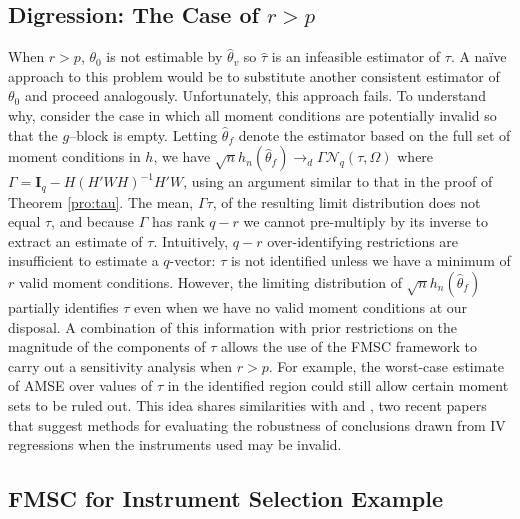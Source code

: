 \documentclass[12pt]{article}
\theoremstyle{definition}
\begin{document}

\subsection{Digression: The Case of $r > p$}
\label{subsec:digress}
When $r > p$,  $\theta_0$ is not estimable by $\widehat{\theta}_v$ so $\widehat{\tau}$ is an infeasible estimator of $\tau$. A na\"{i}ve approach to this problem would be to substitute another consistent estimator of $\theta_0$ and proceed analogously. Unfortunately, this approach fails. To understand why, consider the case in which all moment conditions are potentially invalid so that the $g$--block is empty. Letting $\widehat{\theta}_f$ denote the estimator based on the full set of moment conditions in $h$, we have $\sqrt{n}h_n(\widehat{\theta}_f) \rightarrow_d\Gamma  \mathcal{N}_q(\tau, \Omega)$ where $\Gamma = \mathbf{I}_q - H \left(H'WH\right)^{-1}H'W$, using an argument similar to that in the proof of Theorem \ref{pro:tau}. The mean, $\Gamma \tau$, of the resulting limit distribution does not equal $\tau$, and because $\Gamma$ has rank $q-r$ we cannot pre-multiply by its inverse to extract an estimate of $\tau$. Intuitively, $q-r$ over-identifying restrictions are insufficient to estimate a $q$-vector: $\tau$ is not identified unless we have a minimum of $r$ valid moment conditions. However, the limiting distribution of $\sqrt{n}h_n(\widehat{\theta}_f)$ partially identifies $\tau$ even when we have no valid moment conditions at our disposal. A combination of this information with prior restrictions on the magnitude of the components of $\tau$ allows the use of the FMSC framework to carry out a sensitivity analysis when $r>p$. For example, the worst-case estimate of AMSE over values of $\tau$ in the identified region could still allow certain moment sets to be ruled out. This idea shares similarities with \citet{Kraay} and \citet{Conleyetal}, two recent papers that suggest methods for evaluating the robustness of conclusions drawn from IV regressions when the instruments used may be invalid.



\subsection{FMSC for Instrument Selection Example}
\end{document}
